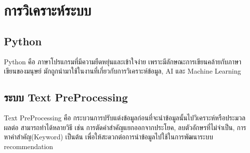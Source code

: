 \section{การวิเคราะห์ระบบ}
\subsection{Python}
Python คือ ภาษาโปรแกรมที่มีความยืดหยุ่นและเข้าใจง่าย เพราะมีลักษณะการเขียนคล้ายกับภาษาเขียนของมนุษย์ มักถูกนำมาใช้ในงานที่เกี่ยวกับการวิเคราะห์ข้อมูล, AI และ Machine Learning 
\cite{python}
\subsection{ระบบ Text PreProcessing}
Text PreProcessing คือ กระบวนการปรับแต่งข้อมูลก่อนที่จะนำข้อมูลนั้นไปวิเคราะห์หรือประมวลผลต่อ สามารถทำได้หลายวิธี เช่น การตัดคำสำคัญแยกออกจากประโยค, ลบตัวอักษรที่ไม่จำเป็น, การหาคำสำคัญ(Keyword) เป็นต้น เพื่อให้สะดวกต่อการนำข้อมูลไปใช้ในการพัฒนาระบบ recommendation
\cite{prepros}

